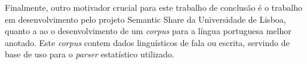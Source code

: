 Finalmente, outro motivador crucial para este trabalho de conclusão é o trabalho em desenvolvimento pelo projeto Semantic Share da Universidade de Lisboa, quanto a ao o desenvolvimento de um \emph{corpus} para a língua portuguesa melhor anotado. Este \emph{corpus} contem dados linguísticos de fala ou escrita, servindo de base de uso para o \emph{parser} estatístico utilizado.




